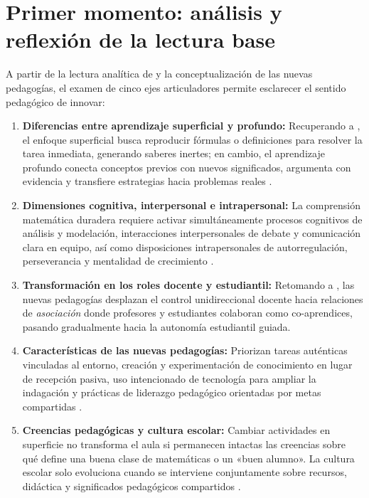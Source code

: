 \documentclass[spanish,letterpaper,oneside]{article}
\begin{document}
\section{Primer momento: análisis y reflexión de la lectura base}
A partir de la lectura analítica de \citet{quiroga2022aprendizaje} y la conceptualización de las nuevas pedagogías, el examen de cinco ejes articuladores permite esclarecer el sentido pedagógico de innovar:
\begin{enumerate}
  \item \textbf{Diferencias entre aprendizaje superficial y profundo:} Recuperando a \citet{marton1976qualitative}, el enfoque superficial busca reproducir fórmulas o definiciones para resolver la tarea inmediata, generando saberes inertes; en cambio, el aprendizaje profundo conecta conceptos previos con nuevos significados, argumenta con evidencia y transfiere estrategias hacia problemas reales \citep{sawyer2008optimizing}.
  \item \textbf{Dimensiones cognitiva, interpersonal e intrapersonal:} La comprensión matemática duradera requiere activar simultáneamente procesos cognitivos de análisis y modelación, interacciones interpersonales de debate y comunicación clara en equipo, así como disposiciones intrapersonales de autorregulación, perseverancia y mentalidad de crecimiento \citep{quiroga2022aprendizaje,schunk2012teorias}.
  \item \textbf{Transformación en los roles docente y estudiantil:} Retomando a \citet{fullan2014rich}, las nuevas pedagogías desplazan el control unidireccional docente hacia relaciones de \textit{asociación} donde profesores y estudiantes colaboran como co-aprendices, pasando gradualmente hacia la autonomía estudiantil guiada.
  \item \textbf{Características de las nuevas pedagogías:} Priorizan tareas auténticas vinculadas al entorno, creación y experimentación de conocimiento en lugar de recepción pasiva, uso intencionado de tecnología para ampliar la indagación y prácticas de liderazgo pedagógico orientadas por metas compartidas \citep{rivas2017innovaciones}.
  \item \textbf{Creencias pedagógicas y cultura escolar:} Cambiar actividades en superficie no transforma el aula si permanecen intactas las creencias sobre qué define una buena clase de matemáticas o un «buen alumno». La cultura escolar solo evoluciona cuando se interviene conjuntamente sobre recursos, didáctica y significados pedagógicos compartidos \citep{quiroga2022aprendizaje}.
\end{enumerate}
\end{document}
